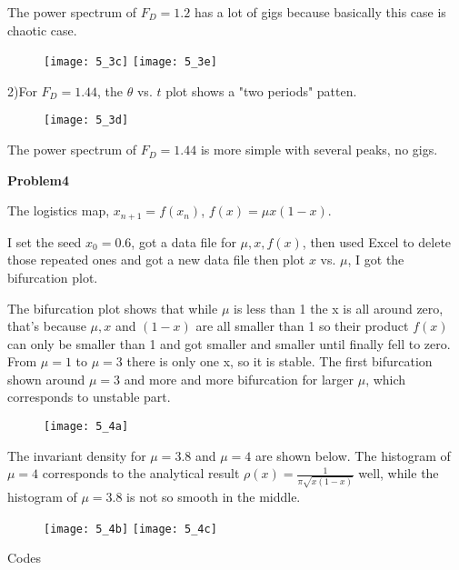 \documentclass{article}
\begin{document}
The power spectrum of $F_D=1.2$ has a lot of gigs because basically this case is chaotic case.
\begin{figure} [ht]
\texttt{[image: 5\_3c]}
\texttt{[image: 5\_3e]}
\end{figure}



2)For $F_D=1.44$, the $\theta$ vs. $t$ plot shows a "two periods" patten.
\begin{figure} [ht]
\texttt{[image: 5\_3d]}
\end{figure}

The power spectrum of $F_D=1.44$ is more simple with several peaks, no gigs.


\newpage
\textbf{Problem4}

The logistics map, $x_{n+1}=f(x_n)$, $f(x)=\mu x(1-x)$.

I set the seed $x_0=0.6$, got a data file for $\mu,x,f(x)$, then used Excel to delete those repeated ones and got a new data file then plot $x$ vs. $\mu$, I got the bifurcation plot. 
 
The bifurcation plot shows that while $\mu$ is less than 1 the x is all around zero, that's because $\mu, x$ and $(1-x)$ are all smaller than 1 so their product $f(x)$ can only be smaller than 1 and got smaller and smaller until finally fell to zero.  From $\mu=1$ to $\mu=3$ there is only one x, so it is stable.  The first bifurcation shown around $\mu=3$ and more and more bifurcation for larger $\mu$, which corresponds to unstable part.
\begin{figure} [ht]
\texttt{[image: 5\_4a]}
\end{figure}

The invariant density for  $\mu=3.8$ and  $\mu=4$ are shown below.
The histogram of $\mu=4$  corresponds to the analytical result $\rho(x) = \frac{1}{\pi \sqrt{x(1-x)}}$ well, while the histogram of $\mu=3.8$ is not so smooth in the middle.
\begin{figure} [ht]
\texttt{[image: 5\_4b]}
\texttt{[image: 5\_4c]}
\end{figure}

\newpage
\appendix
\begin{center} 
\LARGE{Codes}
\end{center}
\end{document}
